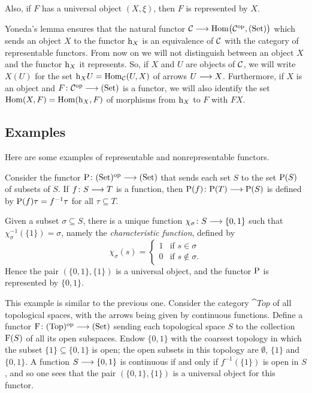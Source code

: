 \begin{2   CONTRAVARIANT FUNCTORS}
\begin{2.1 Yoneda Lemma}
Also, if $F$ has a universal object $(X, \xi)$, then $F$ is represented by $X$.

Yoneda's lemma ensures that the natural functor $\cC \arr \func{\cC}$ which sends an object $X$ to the functor $\mathrm{h}_X$ is an equivalence of $\mathcal{C}$ with the category of representable functors. From now on we will not distinguish between an object $X$ and the functor $\mathrm{h}_X$ it represents. So, if $X$ and $U$ are objects of $\mathcal{C}$, we will write $X(U)$ for the set  $\mathrm{h}_X U = \operatorname{Hom}_{\mathcal{C}}(U,X)$ of arrows $U \arr X$. Furthermore, if $X$ is an object and $F \colon \cC\op \arr \catset$ is a functor, we will also identify the set $\operatorname{Hom}(X, F) = \operatorname{Hom}(\mathrm{h}_X, F)$ of morphisms from $\mathrm{h}_X$ to $F$ with $F X$.



\subsection{Examples}\label{subsec:examples}

Here are some examples of representable and non\dash represent\-a\-ble functors.


\begin{enumeratei}

\item Consider the functor $\rP \colon \catset\op \arr \catset$ that sends each set $S$ to the set $\mathrm{P}(S)$ of subsets of $S$. If $f \colon S \arr T$ is a function, then $\rP(f) \colon \rP(T) \arr \rP(S)$ is defined by $\mathrm{P}(f)\tau = f^{-1}\tau$ for all $\tau \subseteq T$.

Given a subset $\sigma \subseteq S$, there is a unique function $\chi_\sigma \colon S \arr \{0,1\}$ such that $\chi_\sigma^{-1}(\{1\}) = \sigma$, namely the \emph{characteristic function}, defined by 
   \[
   \chi_\sigma(s) = \begin{cases}1 & \text{if $s \in \sigma$}\\
   0 & \text{if $s \notin \sigma$.}
   \end{cases}
   \]
Hence the pair $(\{0,1\}, \{1\})$ is a universal object, and the functor $\mathrm{P}$ is represented by $\{0,1\}$.



\item\label{ex:rep-opensubsets} This example is similar to the previous one. Consider the category $\cat{Top}$ of all topological spaces, with the arrows being given by continuous functions. Define a functor $\rF \colon \cat{Top}\op \arr \catset$ sending each topological space $S$ to the collection $\mathrm{F}(S)$ of all its open subspaces. Endow $\{0,1\}$ with the coarsest topology in which the subset $\{1\} \subseteq \{0,1\}$ is open; the open subsets in this topology are $\emptyset$, $\{1\}$ and $\{0,1\}$. A function $S \arr \{0,1\}$ is continuous if and only if $f^{-1}(\{1\})$ is open in $S$, and so one sees that the pair $(\{0,1\}, \{1\})$ is a universal object for this functor.


\end{enumeratei}
\end{2.1 Yoneda Lemma}
\end{2   CONTRAVARIANT FUNCTORS}
